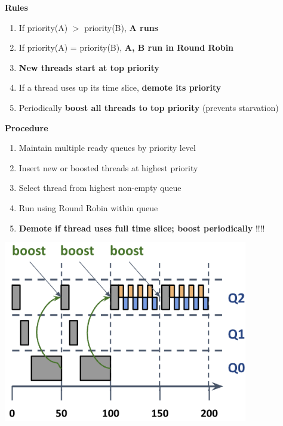 \documentclass[8pt]{extarticle}
\begin{document}
\begin{minipage}[t]{0.5\textwidth}
        \noindent\textbf{Rules}
        \begin{enumerate}[noitemsep,topsep=0pt]
            \item If priority(A) $>$ priority(B), \textbf{A runs}
            \item If priority(A) = priority(B), \textbf{A, B run in Round Robin}
            \item \textbf{New threads start at top priority}
            \item If a thread uses up its time slice, \textbf{demote its priority}
            \item Periodically \textbf{boost all threads to top priority} (prevents starvation)
        \end{enumerate}
        \begin{minipage}[htp]{0.48\textwidth}
        \noindent\textbf{Procedure}
        \begin{enumerate}[noitemsep,topsep=0pt]
            \item Maintain multiple ready queues by priority level
            \item Insert new or boosted threads at highest priority
            \item Select thread from highest non-empty queue
            \item Run using Round Robin within queue
            \item \textbf{Demote if thread uses full time slice; \textbf{boost} periodically} !!!!
        \end{enumerate}
        \end{minipage}
        \hfill
        \begin{minipage}[htp]{0.48\textwidth}
        \begin{center}
            \includegraphics[width=0.8\textwidth]{images/mlfq.png}
        \end{center}
        \end{minipage}
    \end{minipage}
    
\end{document}

